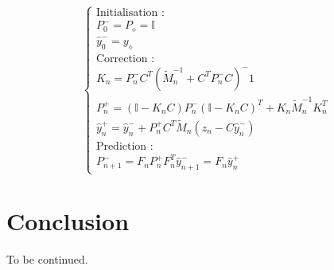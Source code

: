\documentclass[a4paper]{article}
\begin{document}
\[
\begin{cases}
		\text{Initialisation :}\\
		P_0^- = P_{\diamond} = \mathbb{I} \\
		\hat{y}_0^- = y_{\diamond} \\
		\text{Correction :}\\
		K_n = P_n^- C^T (\tilde{M}_n^{-1} + C^TP_n^-C)^-1 \\
		P_n^+ = (\mathbb{I} - K_nC)P_n^-(\mathbb{I}-K_nC)^T + K_n \tilde{M}_n^{-1} K_n^T\\
		\hat{y}_n^+ = \hat{y}_n^- + P_n^+C^T \tilde{M}_n ( z_n - C \hat{y}_n^-)\\
		\text{Prediction :}\\
		P_{n+1}^- = F_n P_n^+ F_n^T
		\hat{y}_{n+1}^- = F_n \hat{y}_n^+
	\end{cases}
\]
   

\section{Conclusion}

To be continued.


\medskip


	
\end{document}

